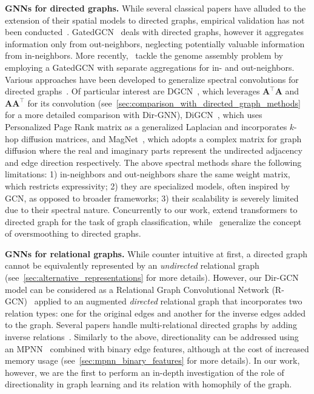 \documentclass{article}
\theoremstyle{plain}
\theoremstyle{definition}
\theoremstyle{remark}
\begin{document}
\textbf{GNNs for directed graphs.}
While several classical papers have alluded to the extension of their spatial models to directed graphs, empirical validation has not been conducted~\cite{Scarselli:2009ku,li2015gated,gilmer2017neural}. GatedGCN~\cite{DBLP:journals/corr/LiTBZ15} deals with directed graphs, however it aggregates information only from out-neighbors, neglecting potentially valuable information from in-neighbors. More recently,~\citet{vrvcek2022learning} tackle the genome assembly problem by employing a GatedGCN with separate aggregations for in- and out-neighbors.
Various approaches have been developed to generalize spectral convolutions for directed graphs~\cite{spectral-dgcn,motifnet}. Of particular interest are DGCN~\cite{dgcn}, which leverages $\mathbf{A}^\top\mathbf{A}$ and $\mathbf{A}\mathbf{A}^\top$ for its convolution (see~\cref{sec:comparison_with_directed_graph_methods} for a more detailed comparison with Dir-GNN), DiGCN~\cite{digraph}, which uses Personalized Page Rank matrix as a generalized Laplacian and incorporates $k$-hop diffusion matrices, and MagNet~\cite{zhang2021magnet}, which adopts a complex matrix for graph diffusion where the real and imaginary parts represent the undirected adjacency and edge direction respectively. 
The above spectral methods share the following limitations: 1) in-neighbors and out-neighbors share the same weight matrix, which restricts expressivity; 2) they are specialized models, often inspired by GCN, as opposed to broader frameworks; 3) their scalability is severely limited due to their spectral nature. Concurrently to our work, \citet{pmlr-v202-geisler23a} extend transformers to directed graph for the task of graph classification, while~\citet{maskey2023fractional} generalize the concept of oversmoothing to directed graphs. 

\textbf{GNNs for relational graphs.} While counter intuitive at first, a directed graph cannot be equivalently represented by an \textit{undirected} relational graph (see~\cref{sec:alternative_representations} for more details). However, our Dir-GCN model can be considered as a Relational Graph Convolutional Network (R-GCN)~\cite{10.1007/978-3-319-93417-4_38} applied to an augmented \textit{directed} relational graph that incorporates two relation types: one for the original edges and another for the inverse edges added to the graph. Several papers handle multi-relational directed graphs by adding inverse relations~\cite{10.1007/978-3-319-93417-4_38,marcheggiani-titov-2017-encoding,DBLP:journals/corr/abs-1904-08745,Vashishth2020Composition-based}. 
Similarly to the above, directionality can be addressed using an MPNN~\cite{gilmer2017neural} combined with binary edge features, although at the cost of increased memory usage (see~\cref{sec:mpnn_binary_features} for more details).
In our work, however, we are the first to perform an in-depth investigation of the role of directionality in graph learning and its relation with homophily of the graph.
\end{document}
